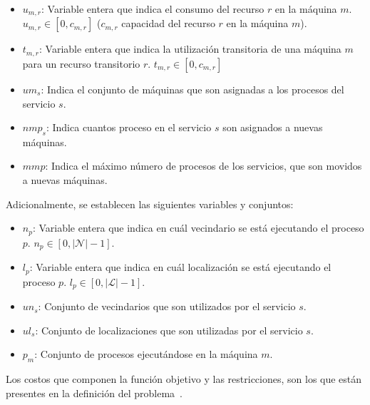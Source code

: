 \documentclass[../informe2.tex]{subfiles}
\begin{document}
\begin{itemize}
	\item $u_{m,r}$: Variable entera que indica el consumo del recurso $r$ en la máquina $m$. $u_{m,r} \in [0,c_{m,r}]$ ($c_{m,r}$ capacidad del recurso $r$ en la máquina $m$).
	\item $t_{m,r}$: Variable entera que indica la utilización transitoria de una máquina $m$ para un recurso transitorio $r$. $t_{m,r} \in [0,c_{m,r}]$
	\item $um_s$: Indica el conjunto de máquinas que son asignadas a los procesos del servicio $s$.
	\item $nmp_s$: Indica cuantos proceso en el servicio $s$ son asignados a nuevas máquinas.
	\item $mmp$: Indica el máximo número de procesos de los servicios, que son movidos a nuevas máquinas.
\end{itemize}
\bigskip
\noindent Adicionalmente, se establecen las siguientes variables y conjuntos:
\begin{itemize}
	\item $n_p$: Variable entera que indica en cuál vecindario se está ejecutando el proceso $p$. $n_p \in [0,|\mathcal{N}|-1]$.
	\item $l_p$: Variable entera que indica en cuál localización se está ejecutando el proceso $p$. $l_p \in [0,|\mathcal{L}|-1]$.
	\item $un_s$: Conjunto de vecindarios que son utilizados por el servicio $s$.
	\item $ul_s$: Conjunto de localizaciones que son utilizadas por el servicio $s$.
	\item $p_m$: Conjunto de procesos ejecutándose en la máquina $m$.
\end{itemize}
\noindent Los costos que componen la función objetivo y las restricciones, son los que están presentes en la definición del problema~\cite{2012ProblemDefinition}.
\end{document}
